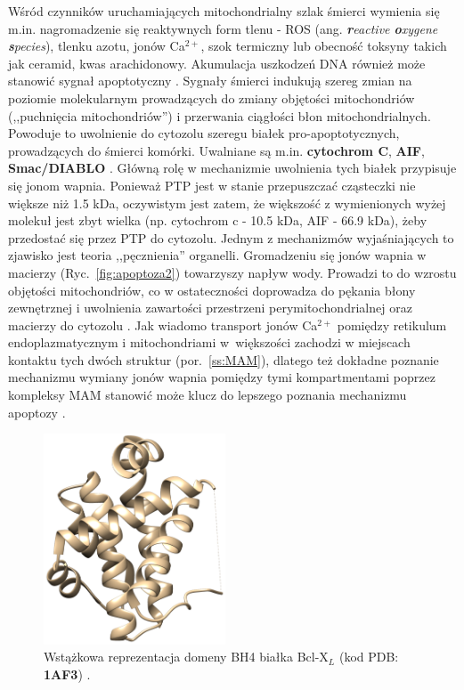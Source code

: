 Wśród czynników uruchamiających mitochondrialny szlak śmierci wymienia się m.in. nagromadzenie się reaktywnych form tlenu - ROS (ang. \textit{\textbf{r}eactive \textbf{o}xygene \textbf{s}pecies}), tlenku azotu, jonów Ca$^{2+}$, szok termiczny lub obecność toksyny takich jak ceramid, kwas arachidonowy. Akumulacja uszkodzeń DNA również może stanowić sygnał apoptotyczny \cite{Klyszejko2002}. Sygnały śmierci indukują szereg zmian na poziomie molekularnym prowadzących do zmiany objętości mitochondriów (,,puchnięcia mitochondriów'') i przerwania ciągłości błon mitochondrialnych. Powoduje to uwolnienie do cytozolu szeregu białek pro-apoptotycznych, prowadzących do śmierci komórki. Uwalniane są m.in. \textbf{cytochrom C}, \textbf{AIF}, \textbf{Smac/DIABLO} \cite{Du2000,Verhagen2000}. Główną rolę w mechanizmie uwolnienia tych białek przypisuje się jonom wapnia. Ponieważ PTP jest w stanie przepuszczać cząsteczki nie większe niż 1.5 kDa, oczywistym jest zatem, że większość z wymienionych wyżej molekuł jest zbyt wielka (np. cytochrom c - 10.5 kDa, AIF - 66.9 kDa), żeby przedostać się przez PTP do cytozolu. Jednym z mechanizmów wyjaśniających to zjawisko jest teoria ,,pęcznienia'' organelli. Gromadzeniu się jonów wapnia w macierzy (Ryc.~\ref{fig:apoptoza2}) towarzyszy napływ wody. Prowadzi to do wzrostu objętości mitochondriów, co w ostateczności doprowadza do pękania błony zewnętrznej i uwolnienia zawartości przestrzeni perymitochondrialnej oraz macierzy do cytozolu \cite{Leo2005}. Jak wiadomo transport jonów Ca$^{2+}$ pomiędzy retikulum endoplazmatycznym i mitochondriami w~większości zachodzi w miejscach kontaktu tych dwóch struktur (por.~\ref{ss:MAM}), dlatego też dokładne poznanie mechanizmu wymiany jonów wapnia pomiędzy tymi kompartmentami poprzez kompleksy MAM stanowić może klucz do lepszego poznania mechanizmu apoptozy \cite{Giorgi2012,Giorgi2011,Hajnoczky2006}.

\begin{figure}
	\includegraphics[width=0.48\textwidth]{rysunki/rozdzial_1/bh.png}
	\caption[Struktura domeny BH4]{Wstążkowa reprezentacja domeny BH4 białka Bcl-X$_L$ (kod PDB: \textbf{1AF3}) \cite{Aritomi1997}.}
	\label{fig:bh}
\end{figure}

